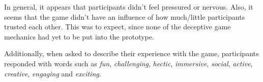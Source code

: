 In general, it appears that participants didn't feel pressured or nervous. Also, it seems that the game didn't have an influence of how much/little participants trusted each other. This was to expect, since none of the deceptive game mechanics had yet to be put into the prototype.

Additionally, when asked to describe their experience with the game, participants responded with words such as \textit{fun}, \textit{challenging}, \textit{hectic}, \textit{immersive}, \textit{social}, \textit{active}, \textit{creative}, \textit{engaging} and \textit{exciting}.